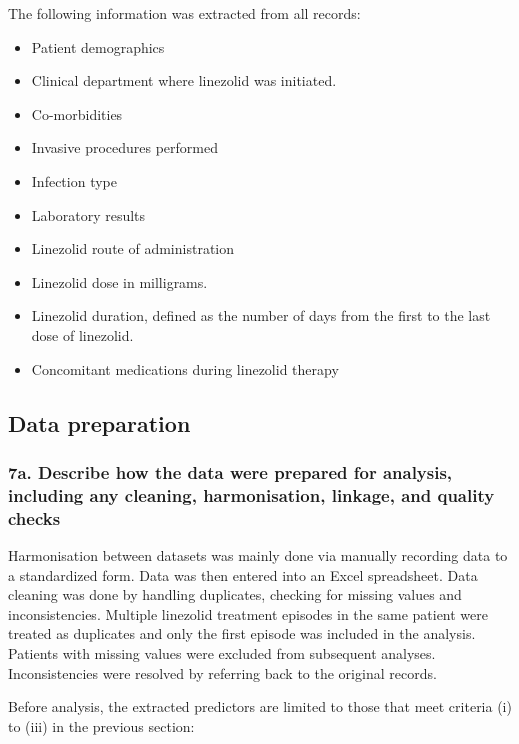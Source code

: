 \documentclass[
  letterpaper,
  DIV=11,
  numbers=noendperiod]{scrartcl}
\providecommand{\tightlist}{%
  \setlength{\itemsep}{0pt}\setlength{\parskip}{0pt}}\usepackage{longtable,booktabs,array}
\begin{document}
The following information was extracted from all records:

\begin{itemize}
\tightlist
\item
  Patient demographics
\item
  Clinical department where linezolid was initiated.
\item
  Co-morbidities
\item
  Invasive procedures performed
\item
  Infection type
\item
  Laboratory results
\item
  Linezolid route of administration
\item
  Linezolid dose in milligrams.
\item
  Linezolid duration, defined as the number of days from the first to
  the last dose of linezolid.
\item
  Concomitant medications during linezolid therapy
\end{itemize}

\subsection{Data preparation}\label{data-preparation}

\subsubsection{7a. Describe how the data were prepared for analysis,
including any cleaning, harmonisation, linkage, and quality
checks}\label{a.-describe-how-the-data-were-prepared-for-analysis-including-any-cleaning-harmonisation-linkage-and-quality-checks}

Harmonisation between datasets was mainly done via manually recording
data to a standardized form. Data was then entered into an Excel
spreadsheet. Data cleaning was done by handling duplicates, checking for
missing values and inconsistencies. Multiple linezolid treatment
episodes in the same patient were treated as duplicates and only the
first episode was included in the analysis. Patients with missing values
were excluded from subsequent analyses. Inconsistencies were resolved by
referring back to the original records.

Before analysis, the extracted predictors are limited to those that meet
criteria (i) to (iii) in the previous section:
\end{document}
